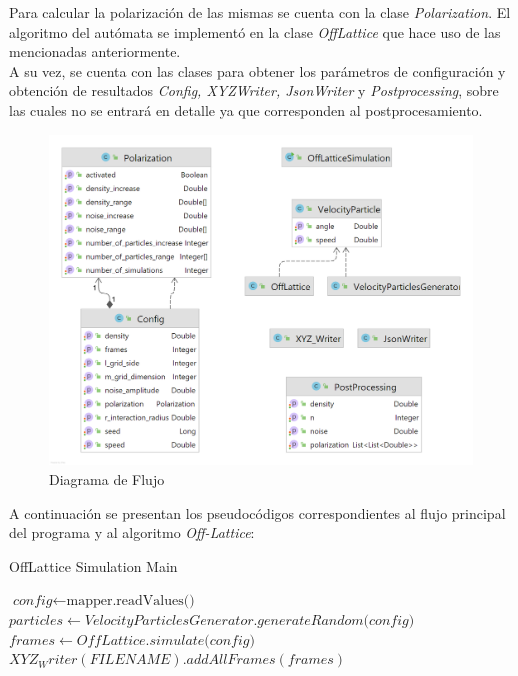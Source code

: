 \documentclass[12pt, a4paper]{report}
\begin{document}
Para calcular la polarización de las mismas se cuenta con la clase \emph{Polarization}. El algoritmo del autómata se implementó en la clase \emph{OffLattice} que hace uso de las mencionadas anteriormente.\\  

A su vez, se cuenta con las clases para obtener los parámetros de configuración y obtención de resultados \emph{Config, XYZWriter, JsonWriter} y \emph{Postprocessing}, sobre las cuales no se entrará en detalle ya que corresponden al postprocesamiento.

\pagebreak

\begin{figure}[h]
\includegraphics[scale=0.3]{UML.png}
\centering 
\caption{Diagrama de Flujo}
\end{figure}

A continuación se presentan los pseudocódigos correspondientes al flujo principal del programa y al algoritmo \emph{Off-Lattice}:

\pagebreak
\begin{algorithm}
    \caption{OffLattice Simulation Main}\label{main}
    \begin{algorithmic}[1]
    \State $\textit{config} \gets \text{mapper.readValues()}$
    \State $particles \gets \textit{VelocityParticlesGenerator.generateRandom(config)}$
    \State $frames \gets \textit{OffLattice.simulate(config)}$
    \State $XYZ_Writer(FILENAME).addAllFrames(frames)$
    \EndProcedure
    \end{algorithmic}
\end{algorithm}
\end{document}
